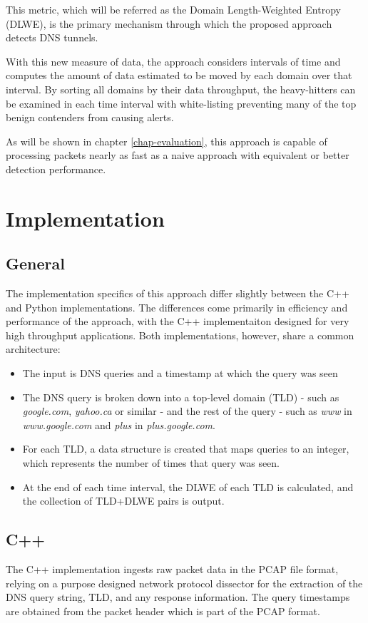 \documentclass[12pt]{report}
\theoremstyle{remark}
\theoremstyle{definition}
\theoremstyle{definition}
\theoremstyle{definition}
\begin{document}
This metric, which will be referred as the Domain Length-Weighted Entropy
(DLWE), is the primary mechanism through which the proposed approach detects DNS
tunnels.

With this new measure of data, the approach considers intervals of time and
computes the amount of data estimated to be moved by each domain over that
interval. By sorting all domains by their data throughput, the heavy-hitters can
be examined in each time interval with white-listing preventing many of the top benign
contenders from causing alerts.

As will be shown in chapter \ref{chap-evaluation}, this approach is capable of
processing packets nearly as fast as a naive approach with equivalent or better
detection performance.

\section{Implementation}
\label{implementation}
\subsection{General}

The implementation specifics of this approach differ slightly between the C++
and Python implementations. The differences come primarily in efficiency and
performance of the approach, with the C++ implementaiton designed for very high
throughput applications. Both implementations, however, share a common
architecture:

\begin{itemize}
\item The input is DNS queries and a timestamp at which the query was seen
\item The DNS query is broken down into a top-level domain (TLD) - such as
\emph{google.com}, \emph{yahoo.ca} or similar - and the rest of the query - such as \emph{www} in \emph{www.google.com} and \emph{plus} in \emph{plus.google.com}.
\item For each TLD, a data structure is created that maps queries
to an integer, which represents the number of times that query was seen.
\item At the end of each time interval, the DLWE of each TLD is calculated, and
the collection of TLD+DLWE pairs is output.
\end{itemize}

\subsection{C++}
\label{cpp-implementation}
The C++ implementation ingests raw packet data in the PCAP file
format, relying on a purpose designed network protocol dissector for the
extraction of the DNS query string, TLD, and any response information. The query
timestamps are obtained from the packet header which is part of the PCAP format.
\end{document}
